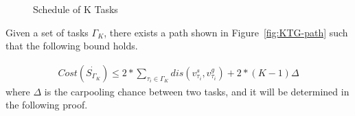 \documentclass[sigconf,anonymous]{aamas}
\begin{document}
\begin{figure}[ht]
  \centering
  \caption{Schedule of K Tasks}
  \label{PKT}
\end{figure}

\begin{theorem}
    \label{thm:TaskGroupCost}
    Given a set of tasks $\Gamma_K$, there exists a path shown in Figure~\ref{fig:KTG-path} 
    such that the following bound holds.
    
    \begin{eqnarray}
        \label{eq:tgc}
        Cost(\dot{S_{\Gamma_K}}) \leq 2 {\ast} \sum_{\tau_i \in \Gamma_K}{dis(v^{s}_{\tau_i}, v^{g}_{\tau_i})} 
        + 2{\ast}(K-1)\Delta
    \end{eqnarray}
    where $\Delta$ is the carpooling chance between two tasks, 
    and it will be determined in the following proof.
\end{theorem}
\end{document}
